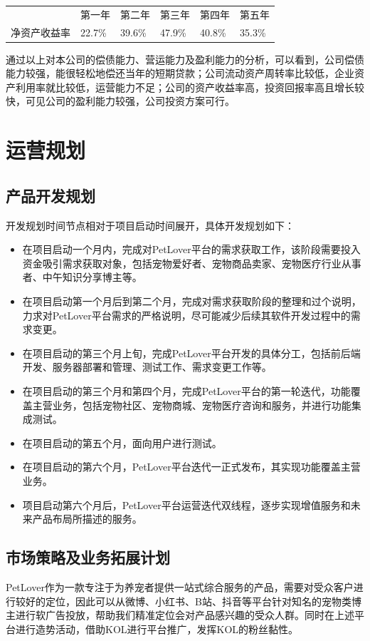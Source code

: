 \documentclass[a4paper]{ctexart}
\begin{document}
    \newpage
    \begin{table}[]\centering
      \begin{tabular}{llllll}
             & 第一年   & 第二年   & 第三年   & 第四年   & 第五年   \\
      净资产收益率 & 22.7\% & 39.6\% & 47.9\% & 40.8\% & 35.3\%
      \end{tabular}
      \end{table}

      通过以上对本公司的偿债能力、营运能力及盈利能力的分析，可以看到，公司偿债能力较强，能很轻松地偿还当年的短期贷款；公司流动资产周转率比较低，企业资产利用率就比较低，运营能力不足；公司的资产收益率高，投资回报率高且增长较快，可见公司的盈利能力较强，公司投资方案可行。
      
\section{运营规划}

\subsection{产品开发规划}
开发规划时间节点相对于项目启动时间展开，具体开发规划如下：

\begin{itemize}
  \item 在项目启动一个月内，完成对PetLover平台的需求获取工作，该阶段需要投入资金吸引需求获取对象，包括宠物爱好者、宠物商品卖家、宠物医疗行业从事者、中午知识分享博主等。
  \item 在项目启动第一个月后到第二个月，完成对需求获取阶段的整理和过个说明，力求对PetLover平台需求的严格说明，尽可能减少后续其软件开发过程中的需求变更。
  \item 在项目启动的第三个月上旬，完成PetLover平台开发的具体分工，包括前后端开发、服务器部署和管理、测试工作、需求变更工作等。
  \item 在项目启动的第三个月和第四个月，完成PetLover平台的第一轮迭代，功能覆盖主营业务，包括宠物社区、宠物商城、宠物医疗咨询和服务，并进行功能集成测试。
  \item 在项目启动的第五个月，面向用户进行测试。
  \item 在项目启动的第六个月，PetLover平台迭代一正式发布，其实现功能覆盖主营业务。
  \item 项目启动第六个月后，PetLover平台运营迭代双线程，逐步实现增值服务和未来产品布局所描述的服务。
\end{itemize}

\subsection{市场策略及业务拓展计划}
PetLover作为一款专注于为养宠者提供一站式综合服务的产品，需要对受众客户进行较好的定位，因此可以从微博、小红书、B站、抖音等平台针对知名的宠物类博主进行软广告投放，帮助我们精准定位会对产品感兴趣的受众人群。同时在上述平台进行造势活动，借助KOL进行平台推广，发挥KOL的粉丝黏性。
\end{document}
